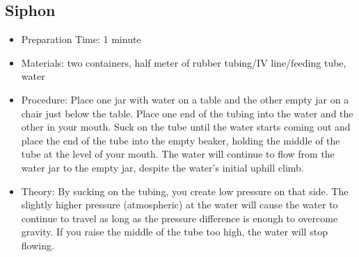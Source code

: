 	
	
\subsection{Siphon}
\begin{itemize}
\item{Preparation Time: 1 minute}
\item{Materials: two containers, half meter of rubber tubing/IV line/feeding tube, water}
\item{Procedure: Place one jar with water on a table and the other empty jar on a chair just below the table. Place one end of the tubing into the water and the other in your mouth. Suck on the tube until the water starts coming out and place the end of the tube into the empty beaker, holding the middle of the tube at the level of your mouth. The water will continue to flow from the water jar to the empty jar, despite the water’s initial uphill climb.}
\item{Theory: By sucking on the tubing, you create low pressure on that side. The slightly higher pressure (atmospheric) at the water will cause the water to continue to travel as long as the pressure difference is enough to overcome gravity. If you raise the middle of the tube too high, the water will stop flowing.}
\end{itemize}


